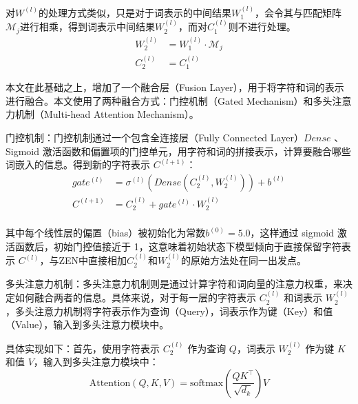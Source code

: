 \documentclass[12pt, a4paper]{ctexart}
\begin{document}
对$W^{(l)}$的处理方式类似，只是对于词表示的中间结果$W^{(l)}_1$，会令其与匹配矩阵${\mathcal{M}}_j$进行相乘，得到词表示中间结果$W^{(l)}_2$，而对$C^{(l)}_1$则不进行处理。
\begin{equation}
    \begin{split}
        W^{(l)}_2 &= W^{(l)}_1 \cdot {\mathcal{M}}_j \\
        C^{(l)}_2 &= C^{(l)}_1
    \end{split}
\end{equation}

本文在此基础之上，增加了一个融合层（Fusion Layer），用于将字符和词的表示进行融合。本文使用了两种融合方式：门控机制（Gated Mechanism）和多头注意力机制（Multi-head Attention Mechanism）。

\vspace{2em} %

门控机制：门控机制通过一个包含全连接层（Fully Connected Layer）$Dense$ 、Sigmoid 激活函数和偏置项的门控单元，用字符和词的拼接表示，计算要融合哪些词嵌入的信息。得到新的字符表示 $C^{(l+1)}$：
\begin{equation}
    \begin{split}
        gate^{(l)} &= {\sigma}^{(l)} (Dense(C^{(l)}_2, W^{(l)}_2) ) + b^{(l)} \\
        C^{(l+1)} &= C^{(l)}_2 + gate^{(l)} \cdot W^{(l)}_2 \\
    \end{split}
\end{equation}

其中每个线性层的偏置（bias）被初始化为常数$b^{(0)} = 5.0$，这样通过 sigmoid 激活函数后，初始门控值接近于 1，这意味着初始状态下模型倾向于直接保留字符表示 $C^{(l)}$，与ZEN中直接相加$C^{(l)}_2$和$W^{(l)}_2$的原始方法处在同一出发点。

\vspace{2em} %

多头注意力机制：多头注意力机制则是通过计算字符和词向量的注意力权重，来决定如何融合两者的信息。具体来说，对于每一层的字符表示 $C^{(l)}_2$ 和词表示 $W^{(l)}_2$，多头注意力机制将字符表示作为查询（Query），词表示作为键（Key）和值（Value），输入到多头注意力模块中。

具体实现如下：首先，使用字符表示 $C^{(l)}_2$ 作为查询 $Q$，词表示 $W^{(l)}_2$ 作为键 $K$ 和值 $V$，输入到多头注意力模块中：
\begin{equation}
    \text{Attention}(Q, K, V) = \text{softmax}\left(\frac{QK^\top}{\sqrt{d_k}}\right)V
\end{equation}
\end{document}
